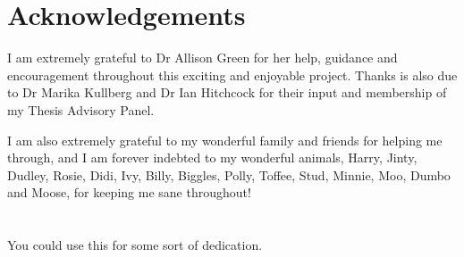 
\chapter*{Acknowledgements}

I am extremely grateful to Dr Allison Green for her help, guidance and encouragement throughout this exciting and enjoyable project.
Thanks is also due to Dr Marika Kullberg and Dr Ian Hitchcock for their input and membership of my Thesis Advisory Panel.

I am also extremely grateful to my wonderful family and friends for helping me through, and I am forever indebted to my wonderful animals, Harry, Jinty, Dudley, Rosie, Didi, Ivy, Billy, Biggles, Polly, Toffee, Stud, Minnie, Moo, Dumbo and Moose, for keeping me sane throughout!



\chapter*{}

\begin{list}{}{%
  \setlength{\leftmargin}{2.1cm}%
  \setlength{\rightmargin}{2.1cm}%
}\item[]
\begin{center}
You could use this for some sort of dedication.
\end{center}
\end{list}


